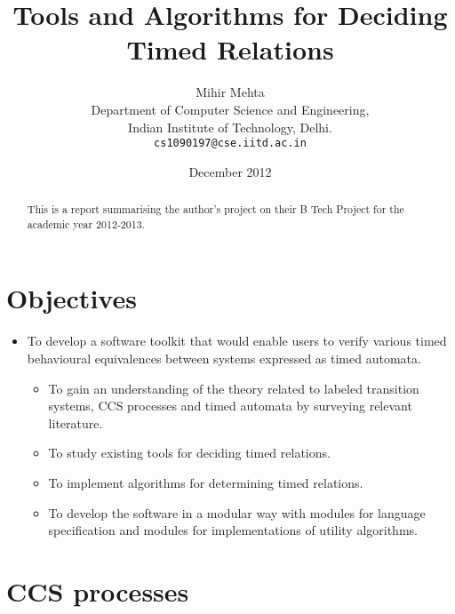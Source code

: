 \documentclass{article}
\begin{document}
\title{Tools and Algorithms for Deciding Timed Relations}

\author{Mihir Mehta\\
Department of Computer Science and Engineering,\\
Indian Institute of Technology, Delhi.\\
\texttt{cs1090197@cse.iitd.ac.in}
}

\date{December 2012}

\maketitle

\begin{abstract}
This is a report summarising the author's project on their B Tech
Project for the academic year 2012-2013.
\end{abstract}

\section{Objectives}

\begin{itemize}

\item To develop a software toolkit that would enable users to verify
  various timed behavioural equivalences between systems expressed as timed automata.

  \begin{itemize}

  \item To gain an understanding of the theory related to labeled
    transition systems, CCS processes and timed automata by surveying
    relevant literature.

  \item To study existing tools for deciding timed relations.

  \item To implement algorithms for determining timed relations.

  \item To develop the software in a modular way with modules for
    language specification and modules for implementations of utility
    algorithms.

  \end{itemize}

\end{itemize}

\section{CCS processes}
\end{document}
